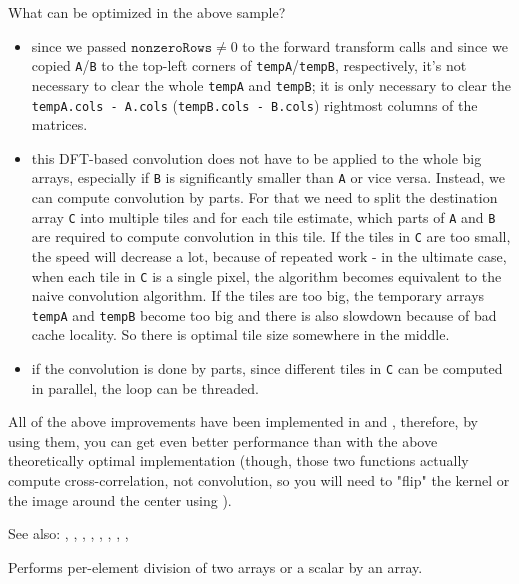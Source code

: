 What can be optimized in the above sample?
\begin{itemize}
    \item since we passed $\texttt{nonzeroRows} \ne 0$ to the forward transform calls and
    since we copied \texttt{A}/\texttt{B} to the top-left corners of \texttt{tempA}/\texttt{tempB}, respectively,
    it's not necessary to clear the whole \texttt{tempA} and \texttt{tempB};
    it is only necessary to clear the \texttt{tempA.cols - A.cols} (\texttt{tempB.cols - B.cols})
    rightmost columns of the matrices.
    \item this DFT-based convolution does not have to be applied to the whole big arrays,
    especially if \texttt{B} is significantly smaller than \texttt{A} or vice versa.
    Instead, we can compute convolution by parts. For that we need to split the destination array
    \texttt{C} into multiple tiles and for each tile estimate, which parts of \texttt{A} and \texttt{B}
    are required to compute convolution in this tile. If the tiles in \texttt{C} are too small,
    the speed will decrease a lot, because of repeated work - in the ultimate case, when each tile in \texttt{C} is a single pixel,
    the algorithm becomes equivalent to the naive convolution algorithm.
    If the tiles are too big, the temporary arrays \texttt{tempA} and \texttt{tempB} become too big
    and there is also slowdown because of bad cache locality. So there is optimal tile size somewhere in the middle.
    \item if the convolution is done by parts, since different tiles in \texttt{C} can be computed in parallel, the loop can be threaded.
\end{itemize}

All of the above improvements have been implemented in  and , therefore, by using them, you can get even better performance than with the above theoretically optimal implementation (though, those two functions actually compute cross-correlation, not convolution, so you will need to "flip" the kernel or the image around the center using ).

See also: , , , , , , , , 


Performs per-element division of two arrays or a scalar by an array.

